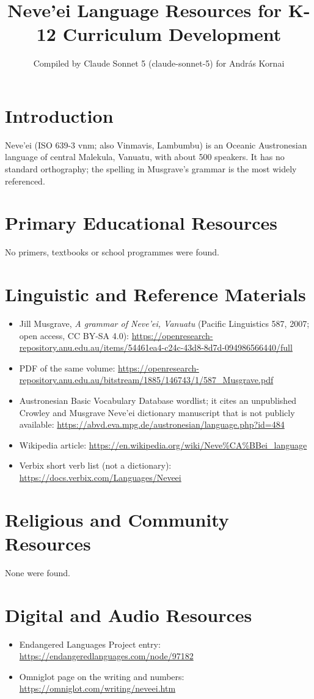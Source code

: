 \documentclass[12pt]{article}
\title{Neve'ei Language Resources for K-12 Curriculum Development}
\author{Compiled by Claude Sonnet 5 (claude-sonnet-5) for Andr\'as Kornai}
\date{}
\begin{document}
\maketitle

\section{Introduction}
Neve'ei (ISO 639-3 vnm; also Vinmavis, Lambumbu) is an Oceanic Austronesian language of central Malekula, Vanuatu, with about 500 speakers. It has no standard orthography; the spelling in Musgrave's grammar is the most widely referenced.

\section{Primary Educational Resources}
No primers, textbooks or school programmes were found.

\section{Linguistic and Reference Materials}
\begin{itemize}
\item Jill Musgrave, \emph{A grammar of Neve'ei, Vanuatu} (Pacific Linguistics 587, 2007; open access, CC BY-SA 4.0): \url{https://openresearch-repository.anu.edu.au/items/54461ea4-c24c-43d8-8d7d-094986566440/full}
\item PDF of the same volume: \url{https://openresearch-repository.anu.edu.au/bitstream/1885/146743/1/587_Musgrave.pdf}
\item Austronesian Basic Vocabulary Database wordlist; it cites an unpublished Crowley and Musgrave Neve'ei dictionary manuscript that is not publicly available: \url{https://abvd.eva.mpg.de/austronesian/language.php?id=484}
\item Wikipedia article: \url{https://en.wikipedia.org/wiki/Neve%CA%BBei_language}
\item Verbix short verb list (not a dictionary): \url{https://docs.verbix.com/Languages/Neveei}
\end{itemize}

\section{Religious and Community Resources}
None were found.

\section{Digital and Audio Resources}
\begin{itemize}
\item Endangered Languages Project entry: \url{https://endangeredlanguages.com/node/97182}
\item Omniglot page on the writing and numbers: \url{https://omniglot.com/writing/neveei.htm}
\end{itemize}
\end{document}
